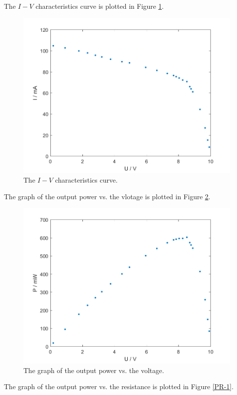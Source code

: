 The $I-V$ characteristics curve is plotted in Figure \ref{IV-1}.
\begin{figure}[H]
\centering
\includegraphics[scale=0.6]{IV1.png}
\caption{The $I-V$ characteristics curve.}
\label{IV-1}
\end{figure}
The graph of the output power vs. the vlotage is plotted in Figure \ref{PV-1}.
\begin{figure}[H]
\centering
\includegraphics[scale=0.6]{PV1.png}
\caption{The graph of the output power vs. the voltage.}
\label{PV-1}
\end{figure}
The graph of the output power vs. the resistance is plotted in Figure \ref{PR-1}.
